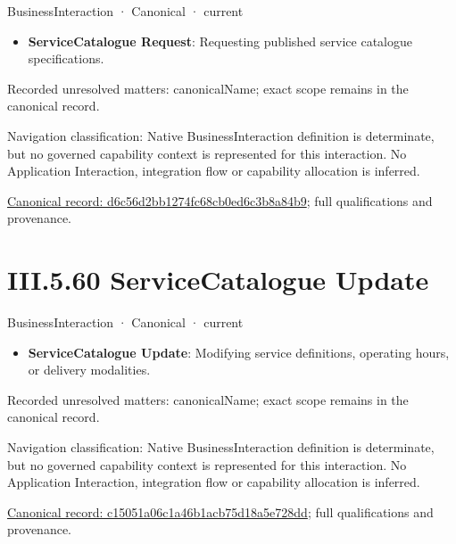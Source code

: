 \label{element:d6c56d2bb1274fc68cb0ed6c3b8a84b9}
{\small BusinessInteraction · Canonical · current}\par

\begin{itemize}


\item \textbf{ServiceCatalogue Request}: Requesting published service catalogue specifications.

\end{itemize}

{\small Recorded unresolved matters: canonicalName; exact scope remains in the canonical record.}\par
{\small Navigation classification: Native BusinessInteraction definition is determinate, but no governed capability context is represented for this interaction. No Application Interaction, integration flow or capability allocation is inferred.}\par
{\footnotesize \href{../../../../../../../continuum/business/business-interaction/d6c56d2bb1274fc68cb0ed6c3b8a84b9.md}{Canonical record: d6c56d2bb1274fc68cb0ed6c3b8a84b9}; full qualifications and provenance.}\par
\section*{III.5.60 ServiceCatalogue Update}
\label{navigation:III.5.60}

\label{element:c15051a06c1a46b1acb75d18a5e728dd}
{\small BusinessInteraction · Canonical · current}\par

\begin{itemize}


\item \textbf{ServiceCatalogue Update}: Modifying service definitions, operating hours, or delivery modalities.

\end{itemize}

{\small Recorded unresolved matters: canonicalName; exact scope remains in the canonical record.}\par
{\small Navigation classification: Native BusinessInteraction definition is determinate, but no governed capability context is represented for this interaction. No Application Interaction, integration flow or capability allocation is inferred.}\par
{\footnotesize \href{../../../../../../../continuum/business/business-interaction/c15051a06c1a46b1acb75d18a5e728dd.md}{Canonical record: c15051a06c1a46b1acb75d18a5e728dd}; full qualifications and provenance.}\par
